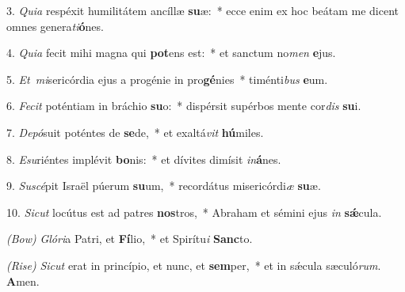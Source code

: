 3. \textit{Quia} respéxit humilitátem ancíllæ \textbf{su}æ:~*
	ecce enim ex hoc beátam me dicent omnes genera\textit{ti}\textbf{ó}nes.

4. \textit{Quia} fecit mihi magna qui \textbf{pot}ens est:~*
	et sanctum no\textit{men} \textbf{e}jus.

5. \textit{Et\ mi}sericórdia ejus a progénie in pro\textbf{gé}nies~*
	timénti\textit{bus} \textbf{e}um.

6. \textit{Fecit} poténtiam in bráchio \textbf{su}o:~*
	dispérsit supérbos mente cor\textit{dis} \textbf{su}i.

7. \textit{Depó}suit poténtes de \textbf{se}de,~*
	et exaltá\textit{vit} \textbf{hú}miles.

8. \textit{Esu}riéntes implévit \textbf{bo}nis:~*
	et dívites dimísit \textit{in}\textbf{á}nes.

9. \textit{Suscé}pit Israël púerum \textbf{su}um,~*
	recordátus misericórdi\textit{æ} \textbf{su}æ.

10. \textit{Sicut} locútus est ad patres \textbf{nos}tros,~*
	Abraham et sémini ejus \textit{in} \textbf{s\'{\ae}}cula.

\textit{(Bow)} \textit{Glóri}a Patri, et \textbf{Fí}lio,~*
	et Spirítu\textit{i} \textbf{Sanc}to.

\textit{(Rise)} \textit{Sicut} erat in princípio, et nunc, et \textbf{sem}per,~*
	et in s\'{\ae}cula sæculó\textit{rum}. \textbf{A}men.